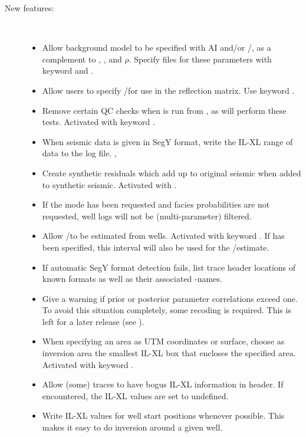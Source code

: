 \begin{description}

\item [New features:] \mbox{ }
  \begin{itemize}
    \item Allow background model to be specified with AI and\!/\!or
      \vp/\vs, as a complement to \vp, \vs, and $\rho$. Specify files
      for these parameters with keyword  and
      . 
    \item Allow users to specify \vp/\vs for use in the
      reflection matrix.  Use keyword . 
    \item Remove certain QC checks when \crava is run from
      \rms, as \rms will perform these tests. Activated with keyword
      . 
    \item When seismic data is given in SegY format, write the IL-XL
      range of data to the log file. , 
    \item Create synthetic residuals which add up to original seismic
      when added to synthetic seismic. Activated with
      . 
    \item If the  mode has been requested and
      facies probabilities are not requested, well logs will not be
      (multi-parameter) filtered. 
    \item Allow \vp/\vs to be estimated from wells. Activated
      with keyword . If
       has been specified, this
      interval will also be used for the \vp/\vs estimate. 
    \item If automatic SegY format detection fails, list trace
      header locations of known formats as well as their associated
      \crava-names. 
    \item Give a warning if prior or posterior parameter correlations
      exceed one. To avoid this situation completely, some recoding is
      required. This is left for a later release (see
      ). 
    \item When specifying an area as UTM coordinates or surface,
      choose as inversion area the smallest IL-XL box that
      encloses the specified area. Activated with keyword
      . 
    \item Allow (some) traces to have bogus IL-XL information in
      header. If encountered, the IL-XL values are set to
      undefined. 
    \item Write IL-XL values for well start positions whenever
      possible. This makes it easy to do inversion around a given
      well. 
 \end{itemize}


\end{description}
